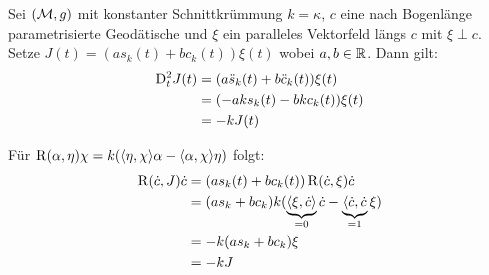 \begin{bsp}
    Sei $(\mathcal{M}, g)$ mit konstanter Schnittkrümmung $k=\kappa$, $c$ eine nach 
    Bogenlänge parametrisierte Geodätische und $\xi$ ein paralleles Vektorfeld längs $c$
    mit $\xi \perp c$.
    Setze $J(t) = (a s_k(t) + b c_k(t)) \xi(t)$ wobei $a, b \in \mathbb{R}$.
    Dann gilt:
\begin{align*}
\mathrm{D}^2_t J(t) &= (a \ddot{s}_k (t) + b \ddot{c}_k (t)) \xi (t)\\
&= (- a k s_k (t) - b k c_k (t)) \xi (t) \\
&= -k J(t)
\end{align*}

Für $\operatorname{R} (\alpha, \eta) \chi = k ( \langle \eta, \chi \rangle \alpha
- \langle \alpha ,\chi\rangle \eta)$ folgt:
\begin{align*}
\operatorname{R} (\dot{c}, J) \dot{c} &= (a s_k (t) + b c_k(t))\operatorname{R} (\dot{c}, \xi) \dot{c}\\
&= (as_k + bc_k)k (\underbrace{\langle\xi,\dot{c}\rangle}_{=0}\dot{c}
- \underbrace{\langle\dot{c},\dot{c}}_{=1}\xi)\\
&= -k(as_k + bc_k)\xi\\
&= - k J
\end{align*}
\end{bsp}




